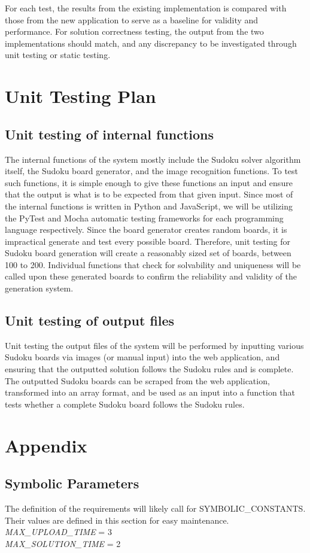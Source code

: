 \documentclass[11pt]{article}
\begin{document}
For each test, the results from the existing implementation is compared with those from the new application to serve as a baseline for validity and performance. For solution correctness testing, the output from the two implementations should match, and any discrepancy to be investigated through unit testing or static testing.
				
\section{Unit Testing Plan}
		
\subsection{Unit testing of internal functions}
The internal functions of the system mostly include the Sudoku solver algorithm itself, the Sudoku board generator, and the image recognition functions. To test such functions, it is simple enough to give these functions an input and ensure that the output is what is to be expected from that given input. Since most of the internal functions is written in Python and JavaScript, we will be utilizing the PyTest and Mocha automatic testing frameworks for each programming language respectively. Since the board generator creates random boards, it is impractical generate and test every possible board. Therefore, unit testing for Sudoku board generation will create a reasonably sized set of boards, between 100 to 200. Individual functions that check for solvability and uniqueness will be called upon these generated boards to confirm the reliability and validity of the generation system. 
		
\subsection{Unit testing of output files}		
Unit testing the output files of the system will be performed by inputting various Sudoku boards via images (or manual input) into the web application, and ensuring that the outputted solution follows the Sudoku rules and is complete. The outputted Sudoku boards can be scraped from the web application, transformed into an array format, and be used as an input into a function that tests whether a complete Sudoku board follows the Sudoku rules. 





\newpage

\section{Appendix}

\subsection{Symbolic Parameters}

The definition of the requirements will likely call for SYMBOLIC\_CONSTANTS.
Their values are defined in this section for easy maintenance.\\

\noindent \emph{MAX\_UPLOAD\_TIME} = 3\\
\emph{MAX\_SOLUTION\_TIME} = 2
\end{document}
